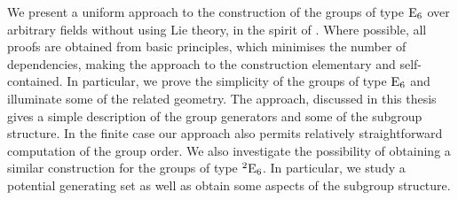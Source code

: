 


\begin{abstracts}        %

We present a uniform approach to the construction of the groups of type $\mathord{\mathrm{E}}_6$ over arbitrary fields without using Lie theory, in
the spirit of \cite{WilsonBook}. Where possible, all proofs are obtained from basic principles, which minimises the number of dependencies, 
making the approach to the construction elementary and self-contained. In particular, we prove the simplicity of the groups of type 
$\mathord{\mathrm{E}}_6$ and illuminate some of the related geometry. The approach, discussed in this thesis gives a simple description of the 
group generators and some of the subgroup structure. In the finite case our approach also permits relatively straightforward 
computation of the group order. We also investigate the possibility of obtaining a similar construction for the groups of type ${}^2\mathord{\mathrm{E}}_6$. 
In particular, we 
study a potential generating set as well as obtain some aspects of the subgroup structure. 


\end{abstracts}




